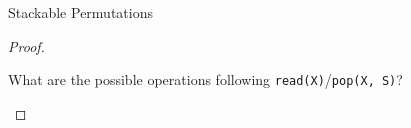 \begin{frame}{}
  \begin{center}
    {\LARGE Stackable Permutations}
  \end{center}
\end{frame}


\begin{frame}{}
  \begin{definition}

  \end{definition}
\end{frame}

% 
% 

\begin{frame}{}

  \begin{center}
  \end{center}

  \pause
  \begin{proof}
    \begin{center}
      What are the possible operations following \texttt{read(X)}/\texttt{pop(X, S)}? \\
    \end{center}
  \end{proof}
\end{frame}

